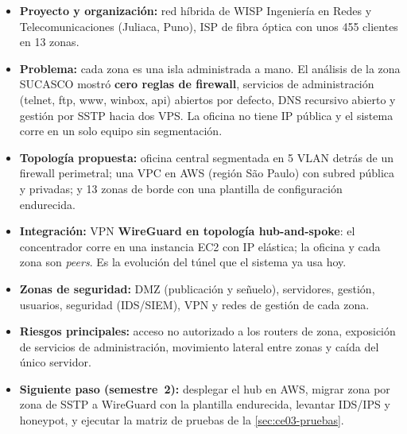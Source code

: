 \begin{itemize}
  \item \textbf{Proyecto y organización:} red híbrida de WISP Ingeniería en Redes y
  Telecomunicaciones (Juliaca, Puno), ISP de fibra óptica con unos 455 clientes en
  13 zonas.
  \item \textbf{Problema:} cada zona es una isla administrada a mano. El análisis de la
  zona SUCASCO mostró \textbf{cero reglas de firewall}, servicios de administración
  (telnet, ftp, www, winbox, api) abiertos por defecto, DNS recursivo abierto y gestión
  por SSTP hacia dos VPS. La oficina no tiene IP pública y el sistema corre en un solo
  equipo sin segmentación.
  \item \textbf{Topología propuesta:} oficina central segmentada en 5 VLAN detrás de
  un firewall perimetral; una VPC en AWS (región São Paulo) con subred pública y
  privadas; y 13 zonas de borde con una plantilla de configuración endurecida.
  \item \textbf{Integración:} VPN \textbf{WireGuard en topología hub-and-spoke}: el
  concentrador corre en una instancia EC2 con IP elástica; la oficina y cada zona son
  \emph{peers}. Es la evolución del túnel que el sistema ya usa hoy.
  \item \textbf{Zonas de seguridad:} DMZ (publicación y señuelo), servidores, gestión,
  usuarios, seguridad (IDS/SIEM), VPN y redes de gestión de cada zona.
  \item \textbf{Riesgos principales:} acceso no autorizado a los routers de zona,
  exposición de servicios de administración, movimiento lateral entre zonas y caída
  del único servidor.
  \item \textbf{Siguiente paso (semestre~2):} desplegar el hub en AWS, migrar zona por
  zona de SSTP a WireGuard con la plantilla endurecida, levantar IDS/IPS y honeypot, y
  ejecutar la matriz de pruebas de la \cref{sec:ce03-pruebas}.
\end{itemize}

